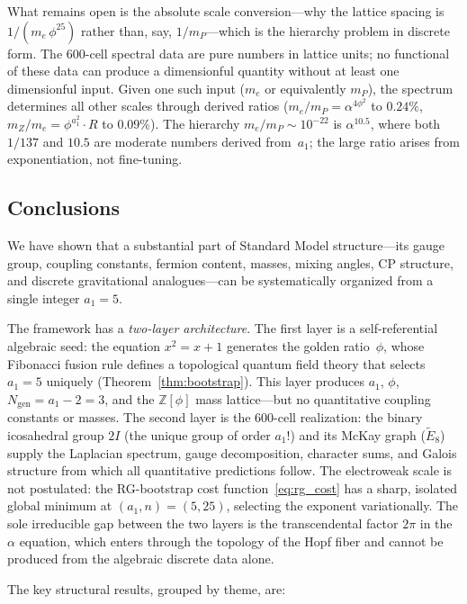 \documentclass[12pt,a4paper]{article}
\theoremstyle{definition}
\begin{document}
What remains open is the absolute scale conversion---why the lattice spacing is $1/(m_e\,\phi^{25})$ rather than, say, $1/m_P$---which is the hierarchy problem in discrete form.  The 600-cell spectral data are pure numbers in lattice units; no functional of these data can produce a dimensionful quantity without at least one dimensionful input.  Given one such input ($m_e$ or equivalently $m_P$), the spectrum determines all other scales through derived ratios ($m_e/m_P = \alpha^{4\phi^2}$ to $0.24\%$, $m_Z/m_e = \phi^{a_1^2} \cdot R$ to $0.09\%$).  The hierarchy $m_e/m_P \sim 10^{-22}$ is $\alpha^{10.5}$, where both $1/137$ and $10.5$ are moderate numbers derived from~$a_1$; the large ratio arises from exponentiation, not fine-tuning.

\subsection{Conclusions}

We have shown that a substantial part of Standard Model structure---its gauge group, coupling constants, fermion content, masses, mixing angles, CP structure, and discrete gravitational analogues---can be systematically organized from a single integer $a_1 = 5$.

The framework has a \emph{two-layer architecture}.  The first layer is a self-referential algebraic seed: the equation $x^2 = x + 1$ generates the golden ratio~$\phi$, whose Fibonacci fusion rule defines a topological quantum field theory that selects $a_1 = 5$ uniquely (Theorem~\ref{thm:bootstrap}).  This layer produces $a_1$, $\phi$, $N_{\text{gen}} = a_1 - 2 = 3$, and the $\mathbb{Z}[\phi]$ mass lattice---but no quantitative coupling constants or masses.  The second layer is the 600-cell realization: the binary icosahedral group $2I$ (the unique group of order $a_1!$) and its McKay graph ($\widetilde{E}_8$) supply the Laplacian spectrum, gauge decomposition, character sums, and Galois structure from which all quantitative predictions follow.  The electroweak scale is not postulated: the RG-bootstrap cost function~\eqref{eq:rg_cost} has a sharp, isolated global minimum at $(a_1, n) = (5, 25)$, selecting the exponent variationally.  The sole irreducible gap between the two layers is the transcendental factor $2\pi$ in the $\alpha$ equation, which enters through the topology of the Hopf fiber and cannot be produced from the algebraic discrete data alone.

The key structural results, grouped by theme, are:
\end{document}
